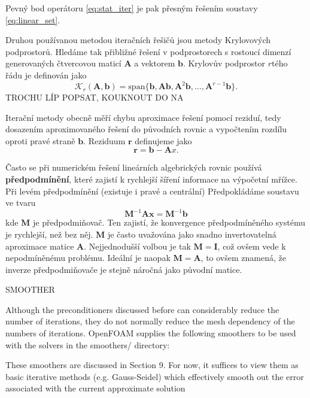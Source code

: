 \documentclass[a4paper,12pt]{report}
\theoremstyle{remark}
\begin{document}
	Pevný bod operátoru \eqref{eq:stat_iter} je pak přesným řešením soustavy \eqref{eq:linear_set}.  
	
	Druhou používanou metodou iteračních řešičů jsou metody Krylovových podprostorů. Hledáme tak přibližné řešení v podprostorech s rostoucí dimenzí generovaných čtvercovou maticí $\boldsymbol{A}$ a vektorem $\boldsymbol{b}$. Krylovův podprostor $r$tého řádu je definován jako 
	$$\mathcal{K}_r(\boldsymbol{A},\boldsymbol{b}) = \textrm{span}\{\boldsymbol{b}, \boldsymbol{Ab}, \boldsymbol{A}^2\boldsymbol{b}, \dots, \boldsymbol{A}^{r-1}\boldsymbol{b}\}.$$
	TROCHU LÍP POPSAT, KOUKNOUT DO NA
	
	Iterační metody obecně měří chybu aproximace řešení pomocí reziduí, tedy dosazením aproximovaného řešení do původních rovnic a vypočtením rozdílu oproti pravé straně $\boldsymbol{b}$. Reziduum $\boldsymbol{r}$ definujeme jako 
	\begin{equation}
		\boldsymbol{r} = \boldsymbol{b}-\boldsymbol{A}x.
		\label{eq:residuum}
	\end{equation} 
	
	
	Často se při numerickém řešení lineárních algebrických rovnic používá \textbf{předpodmínění}, které zajistí k rychlejší šíření informace na výpočetní mřížce. Při levém předpodmínění (existuje i pravé a centrální) Předpokládáme soustavu ve tvaru
	$$\boldsymbol{M}^{-1}\boldsymbol{A}\boldsymbol{x} =\boldsymbol{M}^{-1}\boldsymbol{b}$$
	kde $\boldsymbol{M}$ je předpodmiňovač. Ten zajistí, že konvergence předpodmíněného systému je rychlejší, než bez něj. $\boldsymbol{M}$ je často uvažována jako snadno invertovatelná aproximace matice $\boldsymbol{A}$. Nejjednodušší volbou je tak $\boldsymbol{M} = \boldsymbol{I}$, což ovšem vede k nepodmíněnému problému. Ideální je naopak $\boldsymbol{M} = \boldsymbol{A}$, to ovšem znamená, že inverze předpodmiňovače je stejně náročná jako původní matice.
	

	
	SMOOTHER
	
	Although the preconditioners discussed before can considerably reduce the number of iterations, they do not normally reduce the mesh dependency of the numbers of iterations. OpenFOAM supplies the following smoothers to be used with the solvers in the smoothers/ directory:
	
	These smoothers are discussed in Section 9. For now, it suffices to view them as basic iterative methods (e.g. Gauss-Seidel) which effectively smooth out the error associated with
	the current approximate solution
	
\end{document}
